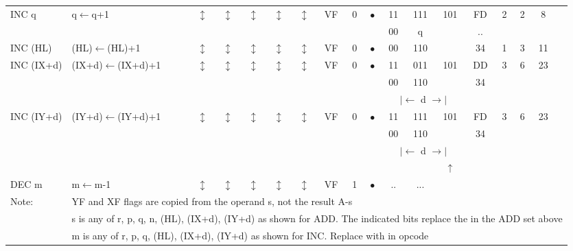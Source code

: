 \documentclass[oneside,a4paper]{book}
\newcommand{\instrt}{\rule{0pt}{2.7ex}}
\newcommand{\instrb}{\rule[-1.7ex]{0pt}{0pt}}
\newcommand{\notet}{\rule{0pt}{2.4ex}}
\newcommand{\noteb}{\rule[-1.3ex]{0pt}{0pt}}
\begin{document}
{\begin{tabular}{llcccccccccccccccl}
		INC q\instrt & 
			q$\leftarrow$q+1 & 
			$\updownarrow$ & 
				$\updownarrow$ & 
				$\updownarrow$ & 
				$\updownarrow$ & 
				$\updownarrow$ & 
				VF & 
				0 & 
				$\bullet$ & 
			11 & 111 & 101 & 
			FD & 2 & 
			2 & 8 & \\ 
		\multicolumn{10}{c}{} & 00 & q & \fbox{100} & .. & \instrb \\

		INC (HL)\instrt & 
			(HL)$\leftarrow$(HL)+1 & 
			$\updownarrow$ & 
				$\updownarrow$ & 
				$\updownarrow$ & 
				$\updownarrow$ & 
				$\updownarrow$ & 
				VF & 
				0 & 
				$\bullet$ & 
			00 & 110 & \fbox{100} & 
			34 & 1 & 
			3 & 11 & \instrb \\

		INC (IX+d)\instrt & 
			(IX+d)$\leftarrow$(IX+d)+1 & 
			$\updownarrow$ & 
				$\updownarrow$ & 
				$\updownarrow$ & 
				$\updownarrow$ & 
				$\updownarrow$ & 
				VF & 
				0 & 
				$\bullet$ & 
			11 & 011 & 101 & 
			DD & 3 & 
			6 & 23 & \\ 
		\multicolumn{10}{c}{} & 00 & 110 & \fbox{100} & 34 & \\
		\multicolumn{10}{c}{} & \multicolumn{3}{c}{$|\longleftarrow$ d $\longrightarrow|$} & \instrb \\

		INC (IY+d)\instrt & 
			(IY+d)$\leftarrow$(IY+d)+1 & 
			$\updownarrow$ & 
				$\updownarrow$ & 
				$\updownarrow$ & 
				$\updownarrow$ & 
				$\updownarrow$ & 
				VF & 
				0 & 
				$\bullet$ & 
			11 & 111 & 101 & 
			FD & 3 & 
			6 & 23 & \\ 
		\multicolumn{10}{c}{} & 00 & 110 & \fbox{100} & 34 & \\
		\multicolumn{10}{c}{} & \multicolumn{3}{c}{$|\longleftarrow$ d $\longrightarrow|$} &  \instrb \\

	& & & & & & & & & & & & $\uparrow$ & & & & & \instrb \\

		DEC m\instrt &
			m$\leftarrow$m-1 & 
			$\updownarrow$ & 
				$\updownarrow$ & 
				$\updownarrow$ & 
				$\updownarrow$ & 
				$\updownarrow$ & 
				VF & 
				1 & 
				$\bullet$ &
			.. & ... & \fbox{101}
			& & 
			& & & \instrb \\

	\hline

		Note:

			& \multicolumn{17}{l}{\parbox{12cm}{\footnotemark[1]YF and XF flags are copied from the operand s, not the result A-s}}\notet\noteb \\

			& \multicolumn{17}{l}{\parbox{12cm}{s is any of r, p, q, n, (HL), (IX+d), (IY+d) as shown for ADD. The indicated bits replace the  in the ADD set above}}\notet\noteb \\

			& \multicolumn{17}{l}{\parbox{12cm}{m is any of r, p, q, (HL), (IX+d), (IY+d) as shown for INC. Replace  with  in opcode}}\notet\noteb \\
	
	\hline

	\end{tabular}
}
\end{document}
